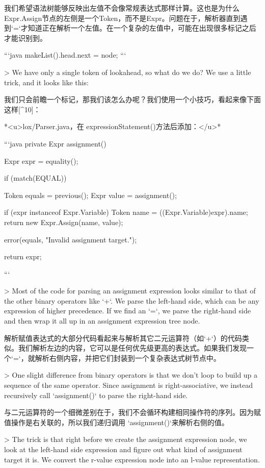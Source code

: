 \documentclass[cn,11pt,chinese]{elegantbook}
\begin{document}
{{{{{{{我们希望语法树能够反映出左值不会像常规表达式那样计算。这也是为什么Expr.Assign节点的左侧是一个Token，而不是Expr。问题在于，解析器直到遇到`=`才知道正在解析一个左值。在一个复杂的左值中，可能在出现很多标记之后才能识别到。

```java
makeList().head.next = node;
```

> We have only a single token of lookahead, so what do we do? We use a little trick, and it looks like this:

我们只会前瞻一个标记，那我们该怎么办呢？我们使用一个小技巧，看起来像下面这样[^10]：

*<u>lox/Parser.java，在 expressionStatement()方法后添加：</u>*

```java
  private Expr assignment() {
    Expr expr = equality();

    if (match(EQUAL)) {
      Token equals = previous();
      Expr value = assignment();

      if (expr instanceof Expr.Variable) {
        Token name = ((Expr.Variable)expr).name;
        return new Expr.Assign(name, value);
      }

      error(equals, "Invalid assignment target."); 
    }

    return expr;
  }
```

> Most of the code for parsing an assignment expression looks similar to that of the other binary operators like `+`. We parse the left-hand side, which can be any expression of higher precedence. If we find an `=`, we parse the right-hand side and then wrap it all up in an assignment expression tree node.

解析赋值表达式的大部分代码看起来与解析其它二元运算符（如`+`）的代码类似。我们解析左边的内容，它可以是任何优先级更高的表达式。如果我们发现一个`=`，就解析右侧内容，并把它们封装到一个复杂表达式树节点中。

> One slight difference from binary operators is that we don’t loop to build up a sequence of the same operator. Since assignment is right-associative, we instead recursively call `assignment()` to parse the right-hand side.

与二元运算符的一个细微差别在于，我们不会循环构建相同操作符的序列。因为赋值操作是右关联的，所以我们递归调用 `assignment()`来解析右侧的值。

> The trick is that right before we create the assignment expression node, we look at the left-hand side expression and figure out what kind of assignment target it is. We convert the r-value expression node into an l-value representation.

}}}}}}}
\end{document}
